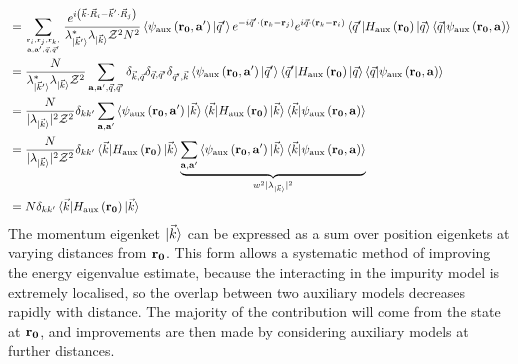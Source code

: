 \documentclass[reprint,hidelinks]{revtex4-2}
\begin{document}
\begin{widetext}
\begin{equation}
\begin{aligned}
								   &= \sum_{{\bf r}_i, {\bf r}_j, {\bf r}_k, \atop{{\bf a}, {\bf a}^\prime, \vec q, \vec q^\prime}}\frac{e^{i\left(\vec{k}\cdot\vec{R}_i - \vec{k}^\prime\cdot\vec{R}_j\right)}}{\lambda^*_{\ket{\vec k^\prime}} \lambda_{\ket{\vec k}} \mathcal{Z}^2 N^2} \braket{\psi_\text{aux}\left({\bf r_0}, {\bf a}^\prime\right)| \vec q^\prime} e^{-i \vec q^\prime \cdot \left({\bf r}_k - {\bf r}_j\right) } e^{i \vec q \cdot \left({\bf r}_k - {\bf r}_i\right)} \braket{\vec q^\prime | H_\text{aux}\left({\bf r_0}\right) | \vec q}  \braket{\vec q | \psi_\text{aux}\left({\bf r_0}, {\bf a}\right)}\\
								   &= \frac{N}{\lambda^*_{\ket{\vec k^\prime}} \lambda_{\ket{\vec k}} \mathcal{Z}^2}\sum_{{\bf a}, {\bf a}^\prime, \vec q, \vec q^\prime} \delta_{\vec k, \vec q} \delta_{\vec q,\vec q^\prime} \delta_{\vec q^\prime,\vec k} \braket{\psi_\text{aux}\left({\bf r_0}, {\bf a}^\prime\right)| \vec q^\prime} \braket{\vec q^\prime | H_\text{aux}\left({\bf r_0}\right) | \vec q}  \braket{\vec q | \psi_\text{aux}\left({\bf r_0}, {\bf a}\right)}\\
								   &= \frac{N}{|\lambda_{\ket{\vec k}}|^2 \mathcal{Z}^2}\delta_{kk^\prime}\sum_{{\bf a}, {\bf a}^\prime} \braket{\psi_\text{aux}\left({\bf r_0}, {\bf a}^\prime\right)| \vec k} \braket{\vec k | H_\text{aux}\left({\bf r_0}\right) | \vec k}  \braket{\vec k | \psi_\text{aux}\left({\bf r_0}, {\bf a}\right)}\\
								   &= \frac{N}{|\lambda_{\ket{\vec k}}|^2 \mathcal{Z}^2}\delta_{kk^\prime}\braket{\vec k | H_\text{aux}\left({\bf r_0}\right) | \vec k} \underbrace{\sum_{{\bf a}, {\bf a}^\prime} \braket{\psi_\text{aux}\left({\bf r_0}, {\bf a}^\prime\right)| \vec k} \braket{\vec k | \psi_\text{aux}\left({\bf r_0}, {\bf a}\right)}}_{w^2 |\lambda_{\ket{\vec k}}|^2}\\
	&= N\delta_{kk^\prime}\braket{\vec k | H_\text{aux}\left({\bf r_0}\right) | \vec k}
\end{aligned}\end{equation}
The momentum eigenket \(\ket{\vec k}\) can be expressed as a sum over position eigenkets at varying distances from \({\bf r_0}\). This form allows a systematic method of improving the energy eigenvalue estimate, because the interacting in the impurity model is extremely localised, so the overlap between two auxiliary models decreases rapidly with distance. The majority of the contribution will come from the state at \({\bf r_0}\), and improvements are then made by considering auxiliary models at further distances. 


\end{widetext}
\end{document}
